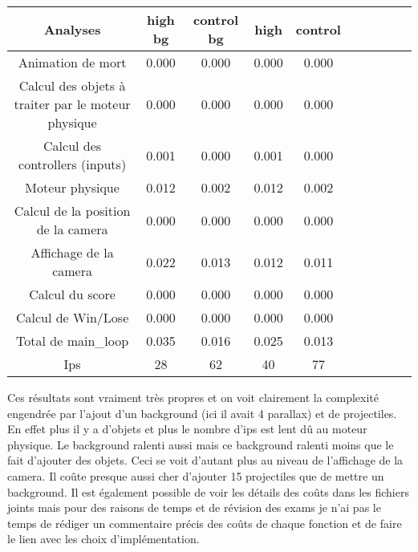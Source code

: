 \documentclass[11pt]{article}
\begin{document}
\begin{tabular}{|*{10}{c|}}
\hline Analyses & high bg & control bg & high & control \\
\hline Animation de mort & 0.000 & 0.000 & 0.000 & 0.000\\
\hline Calcul des objets à traiter par le moteur physique & 0.000 & 0.000 & 0.000 & 0.000\\
\hline Calcul des controllers (inputs) & 0.001 & 0.000 & 0.001 & 0.000\\
\hline Moteur physique & 0.012 & 0.002 & 0.012 & 0.002\\
\hline Calcul de la position de la camera & 0.000 & 0.000 & 0.000 & 0.000\\
\hline Affichage de la camera & 0.022 & 0.013 &0.012 & 0.011\\
\hline Calcul du score & 0.000 & 0.000 & 0.000 & 0.000\\
\hline Calcul de Win/Lose & 0.000 & 0.000 & 0.000 & 0.000\\
\hline \hline Total de main\_loop & 0.035 & 0.016 & 0.025 & 0.013 \\
\hline Ips & 28 & 62 & 40 & 77\\
\hline 
\end{tabular}
Ces résultats sont vraiment très propres et on voit clairement la complexité engendrée par l'ajout d'un background (ici il avait 4 parallax) et de projectiles. En effet plus il y a d'objets et plus le nombre d'ips est lent dû au moteur physique. Le background ralenti aussi mais ce background ralenti moins que le fait d'ajouter des objets. Ceci se voit d'autant plus au niveau de l'affichage de la camera. Il coûte presque aussi cher d'ajouter 15 projectiles que de mettre un background. Il est également possible de voir les détails des coûts dans les fichiers joints mais pour des raisons de temps et de révision des exams je n'ai pas le temps de rédiger un commentaire précis des coûts de chaque fonction et de faire le lien avec les choix d'implémentation.
\end{document}

